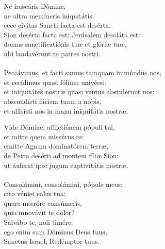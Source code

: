 \begin{translatioMulticol}{2}
Ne irascáris Dómine,\\
ne ultra memíneris iniquitátis:\\
ecce cívitas Sancti facta est desérta:\\
Sion desérta facta est: Jerúsalem desoláta est:\\
domus sanctificatiónis tuæ et glóriæ tuæ,\\
ubi laudavérunt te patres nostri.\\
\\
Peccávimus, et facti sumus tamquam immúndus nos,\\
et cecídimus quasi fólium univérsi:\\
et iniquitátes nostræ quasi ventus abstulérunt nos:\\
abscondísti fáciem tuam a nobis,\\
et allisísti nos in manu iniquitátis nostræ.\columnbreak

Vide Dómine, afflictiónem pópuli tui,\\
et mitte quem missúrus es:\\
emítte Agnum dominatórem terræ,\\
de Petra desérti ad montem fíliæ Sion:\\
ut áuferat ipse jugum captivitátis nostræ.\\
\\
Consolámini, consolámini, pópule meus:\\
cito véniet salus tua:\\
quare mœróre consúmeris,\\
quia innovávit te dolor?\\
Salvábo te, noli timére,\\
ego enim sum Dóminus Deus tuus,\\
Sanctus Israel, Redémptor tuus.
\end{translatioMulticol}
